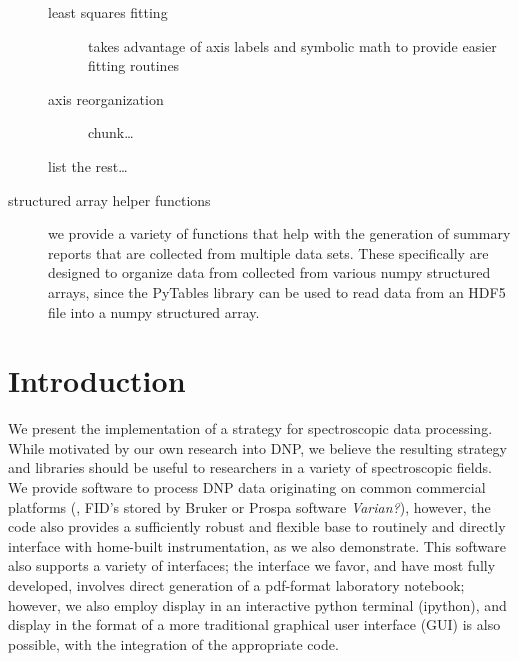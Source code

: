 \begin{description}
\begin{description}
            \item[least squares fitting] takes advantage of axis labels and
                symbolic math to provide easier fitting routines
            \item[axis reorganization] chunk\ldots
            \item[list the rest\ldots]  
        \end{description}
    \item[structured array helper functions]  
        we provide a variety of functions that help with the generation of
        summary reports that are collected from multiple data sets.
        These specifically are designed to organize data from
        collected from various numpy structured arrays,
        since the PyTables library can be used to read data from an HDF5 file
        into a numpy structured array.
\end{description}
\section{Introduction}\label{sec:writeup_software_intro}
We present the implementation
    of a strategy for spectroscopic data processing.
While motivated by our own research into DNP,
    we believe the resulting strategy and libraries
    should be useful to researchers in a variety of spectroscopic fields.
We provide software to process DNP data originating on common commercial platforms (\ie, FID's stored by Bruker or Prospa software \textit{Varian?}),
    however, the code also provides a sufficiently robust and flexible
    base to routinely and directly interface with home-built instrumentation,
    as we also demonstrate.
This software also supports a variety of interfaces;
    the interface we favor, and have most fully developed,
    involves direct generation
    of a pdf-format laboratory notebook;
    however, we also employ display in an interactive
    python terminal (ipython),
    and display in the format of a more traditional graphical
    user interface (GUI) is also possible,
    with the integration of the appropriate code.
